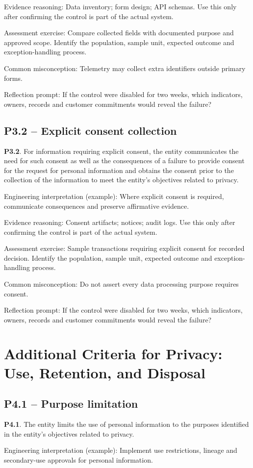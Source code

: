 \documentclass[10pt,oneside]{report}
\begin{document}
Evidence reasoning: Data inventory; form design; API schemas. Use this only after confirming the control is part of the actual system.

Assessment exercise: Compare collected fields with documented purpose and approved scope. Identify the population, sample unit, expected outcome and exception-handling process.

Common misconception: Telemetry may collect extra identifiers outside primary forms.

Reflection prompt: If the control were disabled for two weeks, which indicators, owners, records and customer commitments would reveal the failure?

\subsection{P3.2 -- Explicit consent collection}
\begin{aicpabox}
\textbf{P3.2}. For information requiring explicit consent, the entity communicates the need for such consent as well as the consequences of a failure to provide consent for the request for personal information and obtains the consent prior to the collection of the information to meet the entity's objectives related to privacy.\par{}
\end{aicpabox}
Engineering interpretation (example): Where explicit consent is required, communicate consequences and preserve affirmative evidence.

Evidence reasoning: Consent artifacts; notices; audit logs. Use this only after confirming the control is part of the actual system.

Assessment exercise: Sample transactions requiring explicit consent for recorded decision. Identify the population, sample unit, expected outcome and exception-handling process.

Common misconception: Do not assert every data processing purpose requires consent.

Reflection prompt: If the control were disabled for two weeks, which indicators, owners, records and customer commitments would reveal the failure?

\section{Additional Criteria for Privacy: Use, Retention, and Disposal}
\subsection{P4.1 -- Purpose limitation}
\begin{aicpabox}
\textbf{P4.1}. The entity limits the use of personal information to the purposes identified in the entity's objectives related to privacy.\par{}
\end{aicpabox}
Engineering interpretation (example): Implement use restrictions, lineage and secondary-use approvals for personal information.
\end{document}
